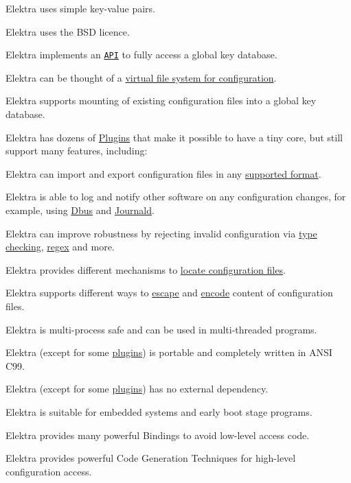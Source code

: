 \begin{DoxyItemize}
\item Elektra uses simple key-\/value pairs.
\item Elektra uses the B\+SD licence.
\item Elektra implements an \href{https://doc.libelektra.org/api/latest/html/}{\tt A\+PI} to fully access a global key database.
\item Elektra can be thought of a \hyperlink{doc_BIGPICTURE_md}{virtual file system for configuration}.
\item Elektra supports mounting of existing configuration files into a global key database.
\item Elektra has dozens of \hyperlink{src_plugins_README_md}{Plugins} that make it possible to have a tiny core, but still support many features, including\+:
\begin{DoxyItemize}
\item Elektra can import and export configuration files in any \hyperlink{src_plugins_README_md}{supported format}.
\item Elektra is able to log and notify other software on any configuration changes, for example, using \hyperlink{md_src_plugins_dbus_README_src_plugins_dbus_README_md}{Dbus} and \hyperlink{md_src_plugins_journald_README_src_plugins_journald_README_md}{Journald}.
\item Elektra can improve robustness by rejecting invalid configuration via \hyperlink{md_src_plugins_type_README_src_plugins_type_README_md}{type checking}, \hyperlink{md_src_plugins_validation_README_src_plugins_validation_README_md}{regex} and more.
\item Elektra provides different mechanisms to \hyperlink{md_src_plugins_resolver_README_src_plugins_resolver_README_md}{locate configuration files}.
\item Elektra supports different ways to \hyperlink{md_src_plugins_ccode_README_src_plugins_ccode_README_md}{escape} and \hyperlink{md_src_plugins_iconv_README_src_plugins_iconv_README_md}{encode} content of configuration files.
\end{DoxyItemize}
\item Elektra is multi-\/process safe and can be used in multi-\/threaded programs.
\item Elektra (except for some \hyperlink{src_plugins_README_md}{plugins}) is portable and completely written in A\+N\+SI C99.
\item Elektra (except for some \hyperlink{src_plugins_README_md}{plugins}) has no external dependency.
\item Elektra is suitable for embedded systems and early boot stage programs.
\item Elektra provides many powerful Bindings to avoid low-\/level access code.
\item Elektra provides powerful Code Generation Techniques for high-\/level configuration access.
\end{DoxyItemize}

